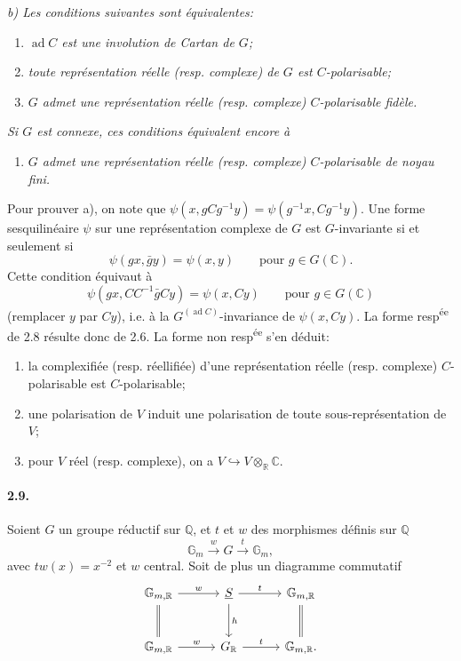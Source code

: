 \documentclass[10pt,leqno]{article}
\newcommand{\C}{\mathbb{C}}
\newcommand{\Q}{\mathbb{Q}}
\newcommand{\R}{\mathbb{R}}
\newcommand{\Gm}{\mathbb{G}_m}
\newcommand{\ad}{\operatorname{ad}}
\newcommand{\into}{\hookrightarrow}
\begin{document}
\emph{b) Les conditions suivantes sont équivalentes:}

\clearpage

\begin{enumerate}[label=(\roman*)]
\item \emph{$\ad C$ est une involution de Cartan de $G$;}
\item \emph{toute représentation réelle (resp. complexe) de $G$ est $C$-polarisable;}
\item \emph{$G$ admet une représentation réelle (resp. complexe) $C$-polarisable fidèle.}
\end{enumerate}
\emph{Si $G$ est connexe, ces conditions équivalent encore à}
\begin{enumerate}[label=(iii\textquotesingle)]
\item \emph{$G$ admet une représentation réelle (resp. complexe) $C$-polarisable de noyau fini.}
\end{enumerate}

Pour prouver a), on note que $\psi(x,gCg^{-1}y)=\psi(g^{-1}x,Cg^{-1}y)$. Une forme sesquilinéaire $\psi$ sur une représentation complexe de $G$ est $G$-invariante si et seulement si
\[
\psi(gx,\bar g y)=\psi(x,y)\qquad\text{pour }g\in G(\C).
\]
Cette condition équivaut à
\[
\psi(gx,CC^{-1}\bar g Cy)=\psi(x,Cy)\qquad\text{pour }g\in G(\C)
\]
(remplacer $y$ par $Cy$), i.e. à la $G^{(\ad C)}$-invariance de $\psi(x,Cy)$. La forme resp\textsuperscript{ée} de 2.8 résulte donc de 2.6. La forme non resp\textsuperscript{ée} s'en déduit:
\begin{enumerate}[label=\alph*)]
\item la complexifiée (resp. réellifiée) d'une représentation réelle (resp. complexe) $C$-polarisable est $C$-polarisable;
\item une polarisation de $V$ induit une polarisation de toute sous-représentation de $V$;
\item pour $V$ réel (resp. complexe), on a $V\into V\otimes_\R\C$.
\end{enumerate}

\paragraph{2.9.} Soient $G$ un groupe réductif sur $\Q$, et $t$ et $w$ des morphismes définis sur $\Q$
\[
\Gm \xrightarrow{\ w\ } G \xrightarrow{\ t\ } \Gm,
\]
avec $tw(x)=x^{-2}$ et $w$ central. Soit de plus un diagramme commutatif
\[
\begin{tikzcd}[column sep=3em,row sep=2.6em]
\mathbb G_{m,\R} \arrow[r,"w"] \arrow[d,equal] & \underline S \arrow[r,"t"] \arrow[d,"h"] & \mathbb G_{m,\R} \arrow[d,equal]\\
\mathbb G_{m,\R} \arrow[r,"w"] & G_\R \arrow[r,"t"] & \mathbb G_{m,\R}.
\end{tikzcd}
\]
\end{document}
